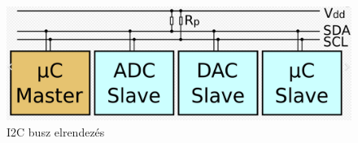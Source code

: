 \begin{figure}[htb]
\begingroup
\tikzset{}
 \centerline{\includegraphics[width=0.6\columnwidth]{.//Figures/tmp/i2c_bus.png}}
 \endgroup
 \caption{I2C busz elrendezés}
 \label{fig:i2c_bus}
\end{figure}